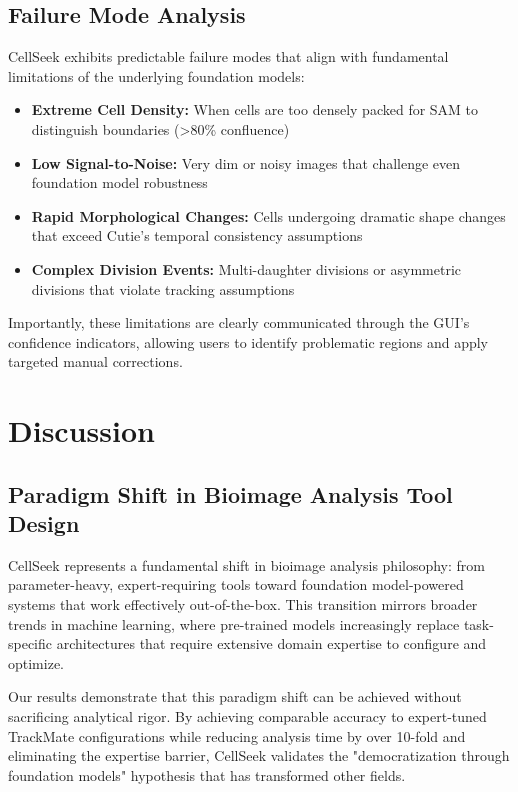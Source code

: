 \documentclass[12pt]{article}
\begin{document}
\subsection{Failure Mode Analysis}


CellSeek exhibits predictable failure modes that align with fundamental limitations of the underlying foundation models:

\begin{itemize}
  \item \textbf{Extreme Cell Density:} When cells are too densely packed for SAM to distinguish boundaries (>80\% confluence)
  \item \textbf{Low Signal-to-Noise:} Very dim or noisy images that challenge even foundation model robustness
  \item \textbf{Rapid Morphological Changes:} Cells undergoing dramatic shape changes that exceed Cutie's temporal consistency assumptions
  \item \textbf{Complex Division Events:} Multi-daughter divisions or asymmetric divisions that violate tracking assumptions
\end{itemize}

Importantly, these limitations are clearly communicated through the GUI's confidence indicators, allowing users to identify problematic regions and apply targeted manual corrections.

\section{Discussion}

\subsection{Paradigm Shift in Bioimage Analysis Tool Design}

CellSeek represents a fundamental shift in bioimage analysis philosophy: from parameter-heavy, expert-requiring tools toward foundation model-powered systems that work effectively out-of-the-box. This transition mirrors broader trends in machine learning, where pre-trained models increasingly replace task-specific architectures that require extensive domain expertise to configure and optimize.

Our results demonstrate that this paradigm shift can be achieved without sacrificing analytical rigor. By achieving comparable accuracy to expert-tuned TrackMate configurations while reducing analysis time by over 10-fold and eliminating the expertise barrier, CellSeek validates the "democratization through foundation models" hypothesis that has transformed other fields.
\end{document}
